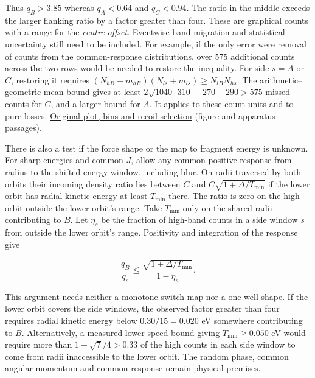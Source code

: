 \documentclass[11pt,a4paper]{article}
\begin{document}
Thus \(q_B>3.85\) whereas \(q_A<0.64\) and \(q_C<0.94\). The ratio in
the middle exceeds the larger flanking ratio by a factor greater than
four. These are graphical counts with a range for the \emph{centre
offset}. Eventwise band migration and statistical uncertainty still need
to be included. For example, if the only error were removal of counts
from the common-response distributions, over 575 additional counts
across the two rows would be needed to restore the inequality. For side
\(s=A\) or \(C\), restoring it requires
\((N_{hB}+m_{hB})(N_{ls}+m_{ls})\ge N_{lB}N_{hs}\). The
arithmetic--geometric mean bound gives at least
\(2\sqrt{1040\cdot310}-270-290>575\) missed counts for \(C\), and a
larger bound for \(A\). It applies to these count units and to pure
losses.
\href{../docs/SchmidtEtAl_HydrogenFragmentEnergies_2012.md}{Original
plot, bins and recoil selection} (figure and apparatus passages).

There is also a test if the force shape or the map to fragment energy is
unknown. For sharp energies and common \(J\), allow any common positive
response from radius to the shifted energy window, including blur. On
radii traversed by both orbits their incoming density ratio lies between
\(C\) and \(C\sqrt{1+\Delta/T_{\min}}\) if the lower orbit has radial
kinetic energy at least \(T_{\min}\) there. The ratio is zero on the
high orbit outside the lower orbit's range. Take \(T_{\min}\) only on
the shared radii contributing to \(B\). Let \(\eta_s\) be the fraction
of high-band counts in a side window \(s\) from outside the lower
orbit's range. Positivity and integration of the response give

\[
 \frac{q_B}{q_s}\le
 \frac{\sqrt{1+\Delta/T_{\min}}}{1-\eta_s}.
\]

This argument needs neither a monotone switch map nor a one-well shape.
If the lower orbit covers the side windows, the observed factor greater
than four requires radial kinetic energy below \(0.30/15=0.020\) eV
somewhere contributing to \(B\). Alternatively, a measured lower speed
bound giving \(T_{\min}\ge0.050\) eV would require more than
\(1-\sqrt7/4>0.33\) of the high counts in each side window to come from
radii inaccessible to the lower orbit. The random phase, common angular
momentum and common response remain physical premises.
\end{document}
